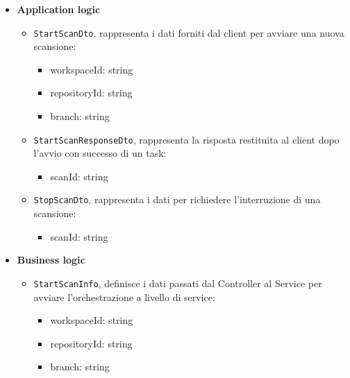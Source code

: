 \documentclass[a4paper, 11pt]{article}
\newcounter{subsubsubsection}[subsubsection]
\newcounter{subsubsubsubsection}[subsubsubsection]
\begin{document}
\begin{itemize}
  \item \textbf{Application logic}
      \begin{itemize}
          \item \texttt{StartScanDto}, rappresenta i dati forniti dal client per avviare una nuova scansione:
          \begin{itemize}
                \item workspaceId: string
                \item repositoryId: string
                \item branch: string
            \end{itemize}
      \item \texttt{StartScanResponseDto}, rappresenta la risposta restituita al client dopo l'avvio con successo di un task:
          \begin{itemize}
                \item scanId: string
            \end{itemize}
      \item \texttt{StopScanDto}, rappresenta i dati per richiedere l'interruzione di una scansione:
          \begin{itemize}
                \item scanId: string
            \end{itemize}
      \end{itemize}

  \item \textbf{Business logic}
      \begin{itemize}
          \item \texttt{StartScanInfo}, definisce i dati passati dal Controller al Service per avviare l'orchestrazione a livello di service:
          \begin{itemize}
                \item workspaceId: string
                \item repositoryId: string
                \item branch: string
            \end{itemize}
      \end{itemize}


\end{itemize}
\end{document}
